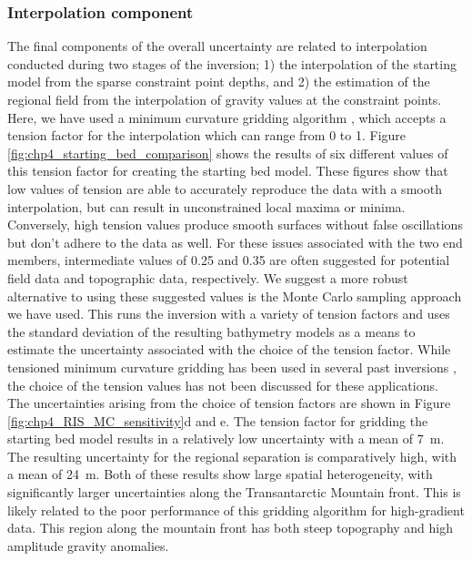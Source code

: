 \subsubsection{Interpolation component}
The final components of the overall uncertainty are related to interpolation conducted during two stages of the inversion; 1) the interpolation of the starting model from the sparse constraint point depths, and 2) the estimation of the regional field from the interpolation of gravity values at the constraint points. Here, we have used a minimum curvature gridding algorithm \citep{smithgridding1990}, which accepts a tension factor for the interpolation which can range from 0 to 1. Figure \ref{fig:chp4_starting_bed_comparison} shows the results of six different values of this tension factor for creating the starting bed model. These figures show that low values of tension are able to accurately reproduce the data with a smooth interpolation, but can result in unconstrained local maxima or minima. Conversely, high tension values produce smooth surfaces without false oscillations but don't adhere to the data as well. For these issues associated with the two end members, intermediate values of 0.25 and 0.35 are often suggested for potential field data and topographic data, respectively. We suggest a more robust alternative to using these suggested values is the Monte Carlo sampling approach we have used. This runs the inversion with a variety of tension factors and uses the standard deviation of the resulting bathymetry models as a means to estimate the uncertainty associated with the choice of the tension factor. While tensioned minimum curvature gridding has been used in several past inversions \citep[e.g.,][]{yangbathymetry2021, millanconstraining2020, anbathymetry2019}, the choice of the tension values has not been discussed for these applications. \\ 

The uncertainties arising from the choice of tension factors are shown in Figure \ref{fig:chp4_RIS_MC_sensitivity}d and e. The tension factor for gridding the starting bed model results in a relatively low uncertainty with a mean of 7~m. The resulting uncertainty for the regional separation is comparatively high, with a mean of 24~m. Both of these results show large spatial heterogeneity, with significantly larger uncertainties along the Transantarctic Mountain front. This is likely related to the poor performance of this gridding algorithm for high-gradient data. This region along the mountain front has both steep topography and high amplitude gravity anomalies. \\

